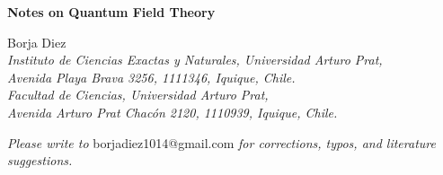 \documentclass[11pt,letterpaper]{article}
\def\author{Borja Diez}
\def\title{Notes on Quantum Field Theory}
\begin{document}
{\centering
 \vspace*{1cm}
\textbf{\LARGE{\title{}}}
\vspace{0.5cm}
\begin{center}
\author{}\\
\vspace{0.5cm}
\textit{Instituto de Ciencias Exactas y Naturales, Universidad Arturo Prat,\\
Avenida Playa Brava 3256, 1111346, Iquique, Chile.\\
Facultad de Ciencias, Universidad Arturo Prat,\\
Avenida Arturo Prat Chac\'on 2120, 1110939, Iquique, Chile.}
\end{center}
\vspace{1cm}
\begin{abstract}
\vspace{0.5cm}
These notes are based on \cite{Ciambelli:2022vot} and are for personal study purposes only.
\end{abstract}}

\vspace{5cm}

\begin{center}
\textit{Please write to} borjadiez1014@gmail.com \textit{for corrections, typos, and literature suggestions.}
\end{center}


\thispagestyle{empty}

\newpage
\tableofcontents
\thispagestyle{empty}
\newpage
\clearpage
{} 



%











\newpage


\end{document}
